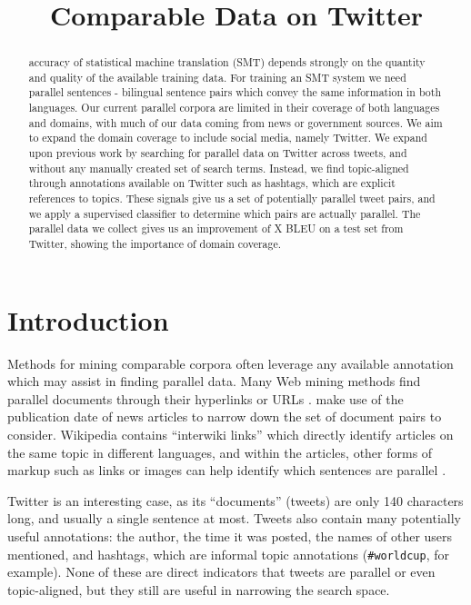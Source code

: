\documentclass[11pt,letterpaper]{article}
\title{Comparable Data on Twitter}
\author{
\anonymize{
Author 1\\
	    XYZ Company\\
	    111 Anywhere Street\\
	    Mytown, NY 10000, USA\\
	    {\tt author1@xyz.org}
	  \And
	Author 2\\
  	ABC University\\
  	900 Main Street\\
  	Ourcity, PQ, Canada A1A 1T2\\
  {\tt author2@abc.ca}
}}
\date{}
\newcommand\adlst{\bgroup\markoverwith{\textcolor{red}{\rule[0.5ex]{2pt}{1pt}}}\ULon}
\begin{document}
\maketitle
\begin{abstract}
\adlst{The} accuracy of statistical machine translation (SMT) depends strongly on the
quantity and quality of the available training data. For training an SMT system
we need parallel sentences - bilingual sentence pairs which
convey the same information in both languages. Our current parallel corpora
are limited in their coverage of both languages and domains, with much of our
data coming from news or government sources. We aim to expand the domain
coverage to include social media, namely Twitter. We expand upon previous work
by searching for parallel data on Twitter across tweets, and without
any manually created set of search terms. Instead, we find topic-aligned
through annotations available on Twitter such as hashtags, which are explicit
references to topics.
These signals give us a set of potentially parallel tweet pairs, and we apply a
supervised classifier to determine which pairs are actually parallel. 
The parallel data we collect gives us an improvement of X BLEU on a test set
from Twitter, showing the importance of domain coverage.
\end{abstract}

\section{Introduction}

Methods for mining comparable corpora often leverage any available annotation
which may assist in finding parallel data. 
Many Web mining methods find parallel documents through their hyperlinks or
URLs \cite{Nie99,Chen00,Resnik99,Resnik03,Smith13}.  make use of the
publication date of news articles to narrow down the set of document pairs to
consider. Wikipedia contains ``interwiki links'' which directly identify
articles on the same topic in different languages, and within the articles,
other forms of markup such as links or images can help identify which
sentences are parallel \cite{Smith10}.

Twitter is an interesting case, as its ``documents'' (tweets) are only 140 characters
long, and usually a single sentence at most. Tweets also contain many
potentially useful annotations: the author, the time it was posted, the names of
other users mentioned, and hashtags, which are informal topic annotations
({\tt \#worldcup}, for example). None of these are direct indicators that tweets
are parallel or even topic-aligned, but they still are useful in narrowing
the search space. 
\end{document}
